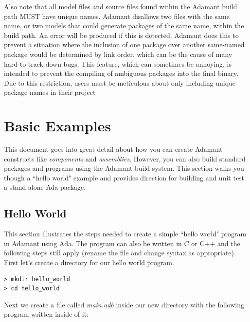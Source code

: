 Also note that all model files and source files found within the Adamant build path MUST have unique names. Adamant disallows two files with the same name, or two models that could generate packages of the same name, within the build path. An error will be produced if this is detected. Adamant does this to prevent a situation where the inclusion of one package over another same-named package would be determined by link order, which can be the cause of many hard-to-track-down bugs. This feature, which can sometimes be annoying, is intended to prevent the compiling of ambiguous packages into the final binary. Due to this restriction, users must be meticulous about only including unique package names in their project 

\newpage
\section{Basic Examples} \label{Basic Examples}

This document goes into great detail about how you can create Adamant constructs like \textit{components} and \textit{assemblies}. However, you can also build standard packages and programs using the Adamant build system. This section walks you though a ``hello world" example and provides direction for building and unit test a stand-alone Ada package.

\subsection{Hello World}

This section illustrates the steps needed to create a simple ``hello world" program in Adamant using Ada. The program can also be written in C or C++ and the following steps still apply (rename the file and change syntax as appropriate). \\

First let's create a directory for our hello world program.

\vspace{5mm} %
\begin{verbatim}
> mkdir hello_world
> cd hello_world
\end{verbatim}
\vspace{5mm} %

Next we create a file called \textit{main.adb} inside our new directory with the following program written inside of it: \\

